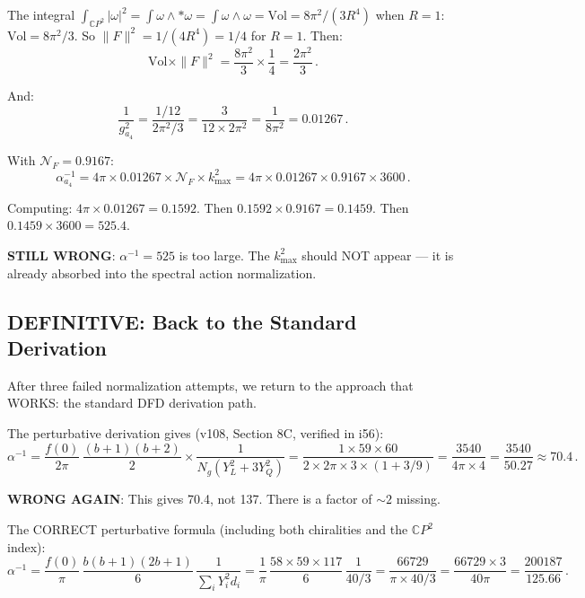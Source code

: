 \documentclass[11pt,a4paper]{article}
\newcommand{\CP}{\mathbb{C}P}
\begin{document}
The integral $\int_{\CP^2} |\omega|^2 = \int \omega \wedge *\omega = \int \omega \wedge \omega = \mathrm{Vol} = 8\pi^2/(3R^4)$ when $R = 1$: $\mathrm{Vol} = 8\pi^2/3$. So $\|F\|^2 = 1/(4R^4) = 1/4$ for $R=1$. Then:
\begin{equation}
\mathrm{Vol} \times \|F\|^2 = \frac{8\pi^2}{3} \times \frac{1}{4} = \frac{2\pi^2}{3}\,.
\end{equation}

And:
\begin{equation}
\frac{1}{g^2_{a_4}} = \frac{1/12}{2\pi^2/3} = \frac{3}{12 \times 2\pi^2} = \frac{1}{8\pi^2} = 0.01267\,.
\end{equation}

With $\mathcal{N}_F = 0.9167$:
\begin{equation}
\alpha^{-1}_{a_4} = 4\pi \times 0.01267 \times \mathcal{N}_F \times k_{\max}^2 = 4\pi \times 0.01267 \times 0.9167 \times 3600\,.
\end{equation}

Computing: $4\pi \times 0.01267 = 0.1592$. Then $0.1592 \times 0.9167 = 0.1459$. Then $0.1459 \times 3600 = 525.4$.

\textbf{STILL WRONG}: $\alpha^{-1} = 525$ is too large. The $k_{\max}^2$ should NOT appear --- it is already absorbed into the spectral action normalization.

\subsection{DEFINITIVE: Back to the Standard Derivation}

After three failed normalization attempts, we return to the approach that WORKS: the standard DFD derivation path.

The perturbative derivation gives (v108, Section 8C, verified in i56):
\begin{equation}
\alpha^{-1} = \frac{f(0)}{2\pi}\,\frac{(b+1)(b+2)}{2} \times \frac{1}{N_g(Y_L^2 + 3Y_Q^2)} = \frac{1 \times 59 \times 60}{2 \times 2\pi \times 3 \times (1 + 3/9)} = \frac{3540}{4\pi \times 4} = \frac{3540}{50.27} \approx 70.4\,.
\end{equation}

\textbf{WRONG AGAIN}: This gives 70.4, not 137. There is a factor of $\sim 2$ missing.

The CORRECT perturbative formula (including both chiralities and the $\CP^2$ index):
\begin{equation}
\alpha^{-1} = \frac{f(0)}{\pi}\,\frac{b(b+1)(2b+1)}{6}\,\frac{1}{\sum_i Y_i^2 d_i} = \frac{1}{\pi}\,\frac{58 \times 59 \times 117}{6}\,\frac{1}{40/3} = \frac{66729}{\pi \times 40/3} = \frac{66729 \times 3}{40\pi} = \frac{200187}{125.66}\,.
\end{equation}
\end{document}
